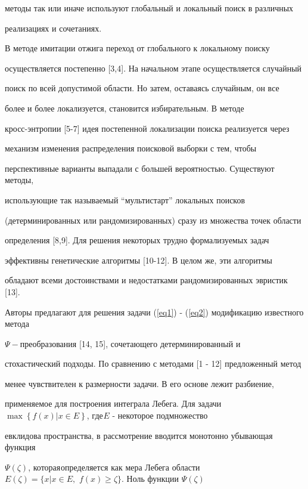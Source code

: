 \documentclass [12pt]{article}
\begin{document}
методы так или иначе используют глобальный и локальный поиск в различных 

реализациях и сочетаниях. 



В методе имитации отжига переход от глобального к локальному поиску 

осуществляется постепенно [3,4]. На начальном этапе осуществляется случайный 

поиск по всей допустимой области. Но затем, оставаясь случайным, он все 

более и более локализуется, становится избирательным. В методе 

кросс-энтропии [5-7] идея постепенной локализации поиска реализуется через 

механизм изменения распределения поисковой выборки с тем, чтобы 

перспективные варианты выпадали с большей вероятностью. Существуют методы, 

использующие так называемый ``мультистарт'' локальных поисков 

(детерминированных или рандомизированных) сразу из множества точек области 

определения [8,9]. Для решения некоторых трудно формализуемых задач 

эффективны генетические алгоритмы [10-12]. В целом же, эти алгоритмы 

обладают всеми достоинствами и недостатками рандомизированных эвристик [13].



Авторы предлагают для решения задачи (\ref{eq1}) - (\ref{eq2}) модификацию известного метода 

$\Psi - $преобразования [14, 15], сочетающего детерминированный и 

стохастический подходы. По сравнению с методами [1 - 12] предложенный метод 

менее чувствителен к размерности задачи. В его основе лежит разбиение, 

применяемое для построения интеграла Лебега. Для задачи $\max \left\{ 

{f(x)\vert x \in E} \right\}$, где$_{ }E$ - некоторое подмножество 

евклидова пространства, в рассмотрение вводится монотонно убывающая функция 

$\Psi (\zeta )$, которая$_{ }$определяется как мера Лебега области $E(\zeta 

) = \{x\vert x \in E,\,\,f(x) \ge \zeta \}$. Ноль функции $\Psi (\zeta )$ 
\end{document}

